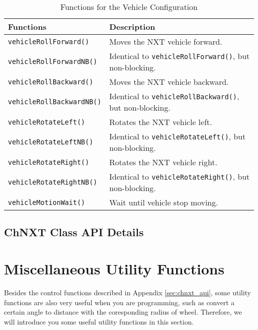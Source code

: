 \begin{table}[!h]
\caption{Functions for the Vehicle Configuration}
\begin{tabular}{ p{6cm}p{10cm} }\hline
Functions & Description\\
\hline
\texttt{vehicleRollForward()}      &Moves the NXT vehicle forward.\\
\texttt{vehicleRollForwardNB()}    &Identical to \texttt{vehicleRollForward()}, but non-blocking.\\
\texttt{vehicleRollBackward()}     &Moves the NXT vehicle backward.\\
\texttt{vehicleRollBackwardNB()}   &Identical to \texttt{vehicleRollBackward()}, but non-blocking.\\
\texttt{vehicleRotateLeft()}       &Rotates the NXT vehicle left.\\
\texttt{vehicleRotateLeftNB()}     &Identical to \texttt{vehicleRotateLeft()}, but non-blocking.\\
\texttt{vehicleRotateRight()}      &Rotates the NXT vehicle right.\\
\texttt{vehicleRotateRightNB()}    &Identical to \texttt{vehicleRotateRight()}, but non-blocking.\\
\texttt{vehicleMotionWait()}       &Wait until vehicle stop moving.\\
\hline
\end{tabular}
\end{table}

\clearpage
\newpage
\subsection{ChNXT Class API Details}


\clearpage
\newpage
\section{\label{sec:ultility_functions}Miscellaneous Utility Functions}
Besides the control functions described in Appendix \ref{sec:chnxt_api}, some utility functions are
also very useful when you are programming, such as convert a certain angle to distance with the 
coresponding radius of wheel. Therefore, we will introduce you some useful utility functions in 
this section.\\

